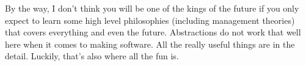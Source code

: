 \documentclass[paper=a4, fontsize=11pt]{scrartcl} %
\numberwithin{equation}{section} %
\numberwithin{figure}{section} %
\numberwithin{table}{section} %
\begin{document}
By the way, I don't think you will be one of the kings of the future if you only expect to learn some high level philosophies (including management theories) that covers everything and even the future. Abstractions do not work that well here when it comes to making software. All the really useful things are in the detail. Luckily, that's also where all the fun is.

\end{document}
